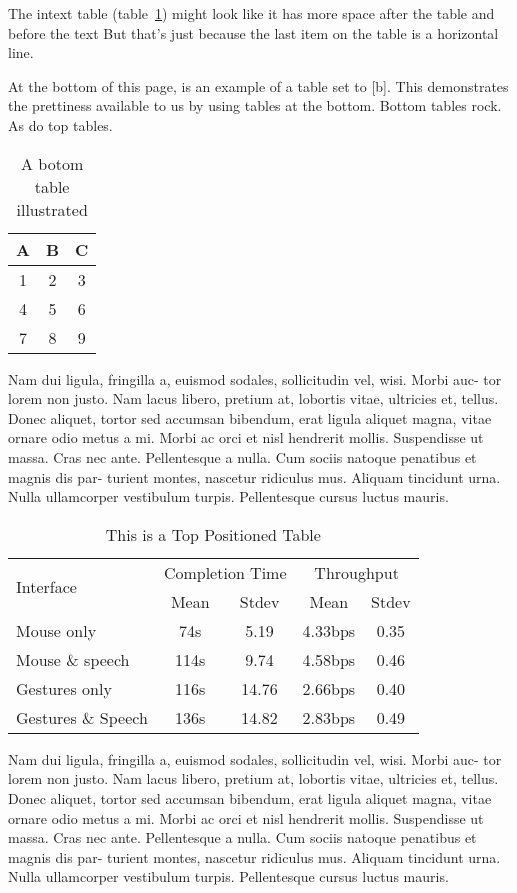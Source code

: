 The intext table (table~\ref{table_silly}) might look like it has more space after the table and before the text
But that's just because the last item on the table is a horizontal line. 

At the bottom of this page, is an example of a table set to [b]. This demonstrates the prettiness available to us by using tables at the bottom. 
Bottom tables rock. As do top tables. 
\begin{table}[b]
\centering
\caption[A bottom table]{A botom table illustrated}
\label{table_silly}
\begin{tabular}{ccc}
    \hline
    A & B & C \\  \hline
    1 & 2 & 3 \\
    4 & 5 & 6 \\
    7 & 8 & 9 \\
    \hline
\end{tabular}
\end{table}

Nam dui ligula, fringilla a, euismod sodales, sollicitudin vel, wisi. Morbi auc-
tor lorem non justo. Nam lacus libero, pretium at, lobortis vitae, ultricies et, tellus.
Donec aliquet, tortor sed accumsan bibendum, erat ligula aliquet magna, vitae ornare
odio metus a mi. Morbi ac orci et nisl hendrerit mollis. Suspendisse ut massa. Cras
nec ante. Pellentesque a nulla. Cum sociis natoque penatibus et magnis dis par-
turient montes, nascetur ridiculus mus. Aliquam tincidunt urna. Nulla ullamcorper
vestibulum turpis. Pellentesque cursus luctus mauris.

\begin{table}[!t]
  \centering
  \caption{This is a Top Positioned Table}
  \begin{tabular}{ l c c c c }
    \hline
    \multirow{2}{*}{Interface} &
    \multicolumn{2}{c}{Completion Time} &
    \multicolumn{2}{c}{Throughput} \\
    
    {} & Mean & Stdev & Mean & Stdev \\ 
    \hline
    Mouse only & 74s & 5.19 & 4.33bps & 0.35 \\
    Mouse \& speech & 114s & 9.74 & 4.58bps & 0.46 \\
    Gestures only & 116s & 14.76 & 2.66bps & 0.40\\
    Gestures \& Speech & 136s & 14.82 & 2.83bps & 0.49\\
    \hline
  \end{tabular}
  \label{tab:ranking}
\end{table}


Nam dui ligula, fringilla a, euismod sodales, sollicitudin vel, wisi. Morbi auc-
tor lorem non justo. Nam lacus libero, pretium at, lobortis vitae, ultricies et, tellus.
Donec aliquet, tortor sed accumsan bibendum, erat ligula aliquet magna, vitae ornare
odio metus a mi. Morbi ac orci et nisl hendrerit mollis. Suspendisse ut massa. Cras
nec ante. Pellentesque a nulla. Cum sociis natoque penatibus et magnis dis par-
turient montes, nascetur ridiculus mus. Aliquam tincidunt urna. Nulla ullamcorper
vestibulum turpis. Pellentesque cursus luctus mauris.

